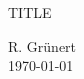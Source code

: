 \documentclass[11pt, a4paper]{article}
\begin{document}
\begin{center}
  \Large{TITLE}
\end{center}

\begin{flushright}
  R. Grünert\\
  \today
\end{flushright}

\section{}

\end{document}
